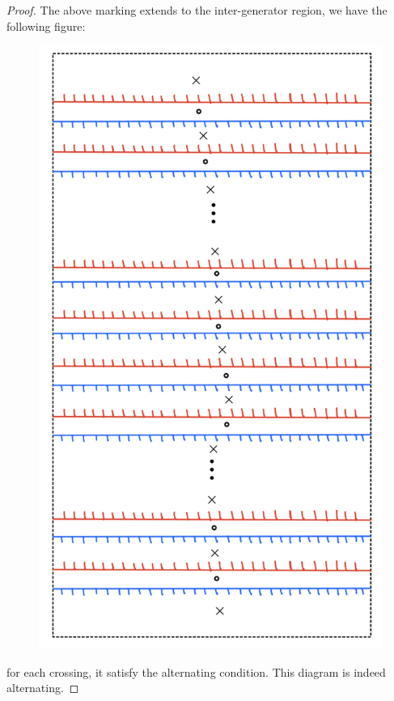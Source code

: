 \begin{proof}
The above marking extends to the inter-generator region, we have the following figure:

\begin{figure}[H] 
    \centering
    \includegraphics[scale = 0.95]{diagrams/natural_alternating_diagrams/12.png}
    \caption{}
    \label{fig:your-label}
\end{figure}

for each crossing, it satisfy the alternating condition. This diagram is indeed alternating.
\end{proof}